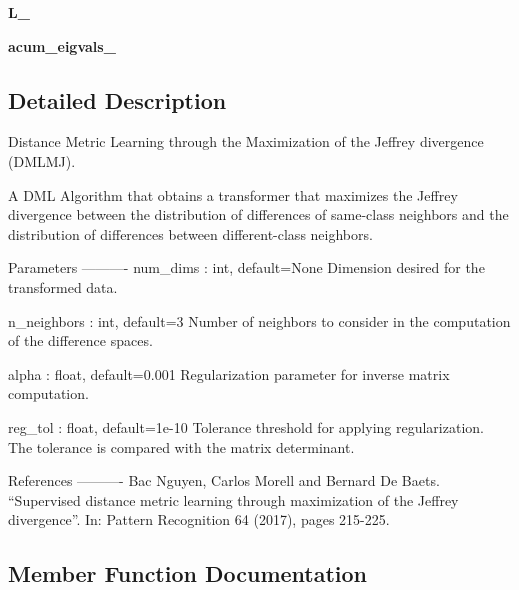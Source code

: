 \begin{DoxyCompactItemize}
\item 
{\bfseries L\+\_\+}\hypertarget{classdml_1_1dmlmj_1_1DMLMJ_ac7c18f71ee66f4e647d4b97406fb2678}{}\label{classdml_1_1dmlmj_1_1DMLMJ_ac7c18f71ee66f4e647d4b97406fb2678}

\item 
{\bfseries acum\+\_\+eigvals\+\_\+}\hypertarget{classdml_1_1dmlmj_1_1DMLMJ_a1e5ee7e4b101147871a86bdc4fd168dd}{}\label{classdml_1_1dmlmj_1_1DMLMJ_a1e5ee7e4b101147871a86bdc4fd168dd}

\end{DoxyCompactItemize}


\subsection{Detailed Description}
\begin{DoxyVerb}Distance Metric Learning through the Maximization of the Jeffrey divergence (DMLMJ).

A DML Algorithm that obtains a transformer that maximizes the Jeffrey divergence between
the distribution of differences of same-class neighbors and the distribution of differences between
different-class neighbors.

Parameters
----------
num_dims : int, default=None
    Dimension desired for the transformed data.

n_neighbors : int, default=3
    Number of neighbors to consider in the computation of the difference spaces.

alpha : float, default=0.001
    Regularization parameter for inverse matrix computation.

reg_tol : float, default=1e-10
    Tolerance threshold for applying regularization. The tolerance is compared with the matrix determinant.

References
----------
    Bac Nguyen, Carlos Morell and Bernard De Baets. “Supervised distance metric learning through
    maximization of the Jeffrey divergence”. In: Pattern Recognition 64 (2017), pages 215-225.
\end{DoxyVerb}
 

\subsection{Member Function Documentation}

